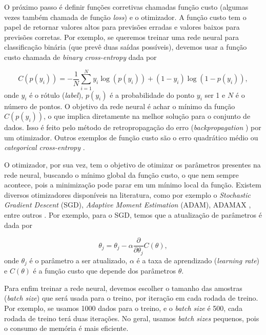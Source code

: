 \documentclass[a4paper,12pt,oneside]{book}
\begin{document}
\par O próximo passo é definir funções corretivas chamadas função custo (algumas vezes também chamada de função \textit{loss}) e o otimizador. A função custo tem o papel de retornar valores altos para previsões erradas e valores baixos para previsões corretas. Por exemplo, se queremos treinar uma rede neural para classificação binária (que prevê duas saídas possíveis), devemos usar a função custo chamada de \textit{binary cross-entropy} dada por \cite{dl_book}

\begin{equation}\label{eq:binary_cross_entropy}
    C(p(y_i)) = -\frac{1}{N}\sum_{i = 1} ^N y_i \log(p(y_i)) + (1 - y_i)\log(1 - p(y_i)),
\end{equation}
%
onde $y_i$ é o rótulo (\textit{label}), $p(y_i)$ é a probabilidade do ponto $y_i$ ser 1 e $N$ é o número de pontos. O objetivo da rede neural é achar o mínimo da função $C(p(y_i))$, o que implica diretamente na melhor solução para o conjunto de dados. Isso é feito pelo método de retropropagação do erro (\textit{backpropagation} \cite{backpropagation}) por um otimizador. Outros exemplos de função custo são o erro quadrático médio ou \textit{categorical cross-entropy} \cite{MSE_CEF_review}.

\par O otimizador, por sua vez, tem o objetivo de otimizar os parâmetros presentes na rede neural, buscando o mínimo global da função custo, o que nem sempre acontece, pois a minimização pode parar em um mínimo local da função. Existem diversos otimizadores disponíveis na literatura, como por exemplo o \textit{Stochastic Gradient Descent} (SGD), \textit{Adaptive Moment Estimation} (ADAM), ADAMAX \cite{ADAMAX}, entre outros \cite{gradient_over}. Por exemplo, para o SGD, temos que a atualização de parâmetros é dada por

\begin{equation}\label{eq:SGD}
    \theta_j = \theta_{j} - \alpha \frac{\partial }{\partial \theta_j}C(\theta),
\end{equation}
%
onde $\theta_j$ é o parâmetro a ser atualizado, $\alpha$ é a taxa de aprendizado (\textit{learning rate}) e $C(\theta)$ é a função custo que depende dos parâmetros $\theta$.

\par Para enfim treinar a rede neural, devemos escolher o tamanho das amostras (\textit{batch size}) que será usada para o treino, por iteração em cada rodada de treino. Por exemplo, se usamos 1000 dados para o treino, e o \textit{batch size} é 500, cada rodada de treino terá duas iterações. No geral, usamos \textit{batch sizes} pequenos, pois o consumo de memória é mais eficiente.
\end{document}
